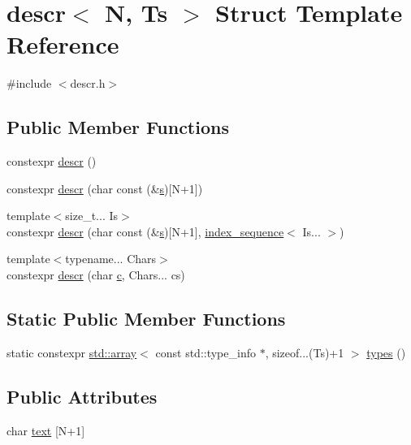 \hypertarget{structdescr}{}\section{descr$<$ N, Ts $>$ Struct Template Reference}
\label{structdescr}


{\ttfamily \#include $<$descr.\+h$>$}

\subsection*{Public Member Functions}
\begin{DoxyCompactItemize}
\item 
constexpr \mbox{\hyperlink{structdescr_a0bc466eee765ce14e9146d914d326fb3}{descr}} ()
\item 
constexpr \mbox{\hyperlink{structdescr_ad61bf6ae3323c8a562a64b8cffe28f38}{descr}} (char const (\&\mbox{\hyperlink{_s_d_l__opengl_8h_a4af680a6c683f88ed67b76f207f2e6e4}{s}})\mbox{[}N+1\mbox{]})
\item 
{\footnotesize template$<$size\+\_\+t... Is$>$ }\\constexpr \mbox{\hyperlink{structdescr_a1a50be3843503213c2d68a7ba41a3462}{descr}} (char const (\&\mbox{\hyperlink{_s_d_l__opengl_8h_a4af680a6c683f88ed67b76f207f2e6e4}{s}})\mbox{[}N+1\mbox{]}, \mbox{\hyperlink{structindex__sequence}{index\+\_\+sequence}}$<$ Is... $>$)
\item 
{\footnotesize template$<$typename... Chars$>$ }\\constexpr \mbox{\hyperlink{structdescr_aefea536f4cfdb5f7f0a62940e5c98739}{descr}} (char \mbox{\hyperlink{_s_d_l__opengl__glext_8h_a1f2d7f8147412c43ba2303a56f97ee73}{c}}, Chars... cs)
\end{DoxyCompactItemize}
\subsection*{Static Public Member Functions}
\begin{DoxyCompactItemize}
\item 
static constexpr \mbox{\hyperlink{_s_d_l__opengl__glext_8h_a52f38e7d822a46377fde7a02708eedb1}{std\+::array}}$<$ const std\+::type\+\_\+info $\ast$, sizeof...(Ts)+1 $>$ \mbox{\hyperlink{structdescr_aa50422546de62bc8ff59842d849c80a9}{types}} ()
\end{DoxyCompactItemize}
\subsection*{Public Attributes}
\begin{DoxyCompactItemize}
\item 
char \mbox{\hyperlink{structdescr_a68a25e9d18ffb4238b84b35b2757f63d}{text}} \mbox{[}N+1\mbox{]}
\end{DoxyCompactItemize}


